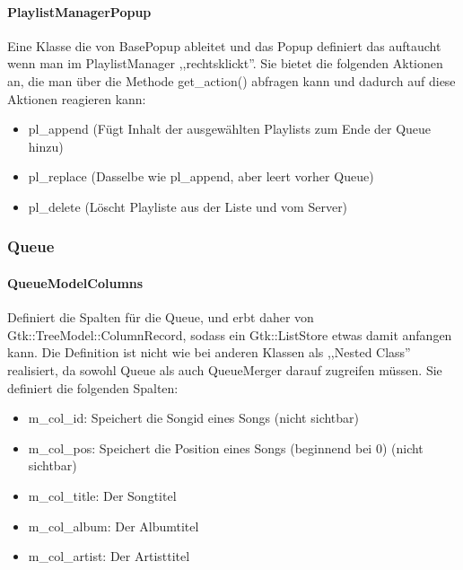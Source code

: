 \paragraph{PlaylistManagerPopup}
Eine Klasse die von BasePopup ableitet und das Popup definiert das auftaucht wenn man im PlaylistManager ,,rechtsklickt''.
Sie bietet die folgenden Aktionen an, die man über die Methode get\_action() abfragen kann und dadurch auf diese Aktionen reagieren kann:
\begin{itemize}
\item pl\_append (Fügt Inhalt der ausgewählten Playlists zum Ende der Queue hinzu)
\item pl\_replace (Dasselbe wie pl\_append, aber leert vorher Queue)
\item pl\_delete (Löscht Playliste aus der Liste und vom Server)
\end{itemize}

\subsubsection{Queue}
\paragraph{QueueModelColumns}
Definiert die Spalten für die Queue, und erbt daher von Gtk::TreeModel::ColumnRecord, sodass ein Gtk::ListStore etwas damit anfangen kann.
Die Definition ist nicht wie bei anderen Klassen als ,,Nested Class'' realisiert, da sowohl Queue als auch QueueMerger darauf zugreifen müssen. 
Sie definiert die folgenden Spalten:
\begin{itemize}
\item m\_col\_id: Speichert die Songid eines Songs (nicht sichtbar)
\item m\_col\_pos: Speichert die Position eines Songs (beginnend bei 0) (nicht sichtbar)
\item m\_col\_title: Der Songtitel
\item m\_col\_album: Der Albumtitel
\item m\_col\_artist: Der Artisttitel
\end{itemize}

